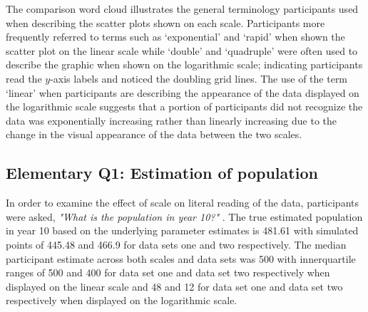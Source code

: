 \documentclass[print]{nuthesis}
\begin{document}
The comparison word cloud illustrates the general terminology participants used when describing the scatter plots shown on each scale.
Participants more frequently referred to terms such as `exponential' and `rapid' when shown the scatter plot on the linear scale while `double' and `quadruple' were often used to describe the graphic when shown on the logarithmic scale; indicating participants read the \(y\)-axis labels and noticed the doubling grid lines.
The use of the term `linear' when participants are describing the appearance of the data displayed on the logarithmic scale suggests that a portion of participants did not recognize the data was exponentially increasing rather than linearly increasing due to the change in the visual appearance of the data between the two scales.

\hypertarget{elementary-q1-estimation-of-population}{%
\subsection{Elementary Q1: Estimation of population}\label{elementary-q1-estimation-of-population}}

In order to examine the effect of scale on literal reading of the data, participants were asked, \textit{"What is the population in year 10?"} .
The true estimated population in year 10 based on the underlying parameter estimates is 481.61 with simulated points of 445.48 and 466.9 for data sets one and two respectively.
The median participant estimate across both scales and data sets was 500 with innerquartile ranges of 500 and 400 for data set one and data set two respectively when displayed on the linear scale and 48 and 12 for data set one and data set two respectively when displayed on the logarithmic scale.
\end{document}
